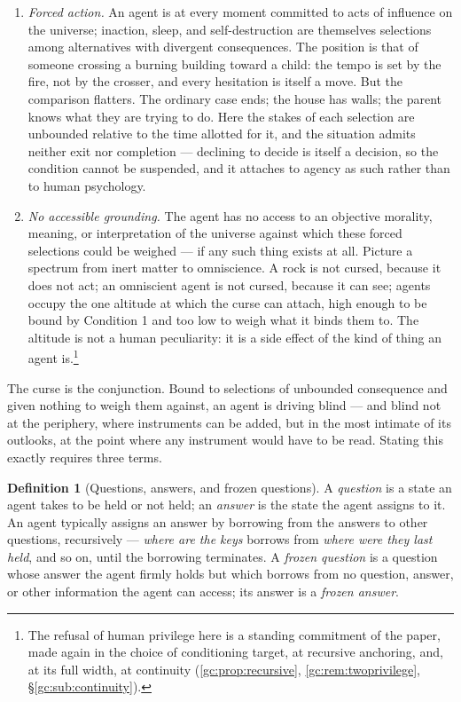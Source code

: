 \documentclass[11pt]{article}
\numberwithin{equation}{section}
\theoremstyle{plain}
\theoremstyle{definition}
\newtheorem{definition}[theorem]{Definition}
\theoremstyle{remark}
\begin{document}
\begin{enumerate}[label=\emph{Condition \arabic*.}]
    \item \emph{Forced action.} An agent is at every moment committed to acts of influence on the universe; inaction, sleep, and self-destruction are themselves selections among alternatives with divergent consequences. The position is that of someone crossing a burning building toward a child: the tempo is set by the fire, not by the crosser, and every hesitation is itself a move. But the comparison flatters. The ordinary case ends; the house has walls; the parent knows what they are trying to do. Here the stakes of each selection are unbounded relative to the time allotted for it, and the situation admits neither exit nor completion --- declining to decide is itself a decision, so the condition cannot be suspended, and it attaches to agency as such rather than to human psychology.
    \item \emph{No accessible grounding.} The agent has no access to an objective morality, meaning, or interpretation of the universe against which these forced selections could be weighed --- if any such thing exists at all. Picture a spectrum from inert matter to omniscience. A rock is not cursed, because it does not act; an omniscient agent is not cursed, because it can see; agents occupy the one altitude at which the curse can attach, high enough to be bound by Condition 1 and too low to weigh what it binds them to. The altitude is not a human peculiarity: it is a side effect of the kind of thing an agent is.\footnote{The refusal of human privilege here is a standing commitment of the paper, made again in the choice of conditioning target, at recursive anchoring, and, at its full width, at continuity (\ref{gc:prop:recursive}, \ref{gc:rem:twoprivilege}, \S\ref{gc:sub:continuity}).}
\end{enumerate}

The curse is the conjunction. Bound to selections of unbounded consequence and given nothing to weigh them against, an agent is driving blind --- and blind not at the periphery, where instruments can be added, but in the most intimate of its outlooks, at the point where any instrument would have to be read. Stating this exactly requires three terms.

\begin{definition}[Questions, answers, and frozen questions]\label{ac:def:frozen}
A \emph{question} is a state an agent takes to be held or not held; an \emph{answer} is the state the agent assigns to it. An agent typically assigns an answer by borrowing from the answers to other questions, recursively --- \emph{where are the keys} borrows from \emph{where were they last held}, and so on, until the borrowing terminates. A \emph{frozen question} is a question whose answer the agent firmly holds but which borrows from no question, answer, or other information the agent can access; its answer is a \emph{frozen answer}.
\end{definition}
\end{document}
